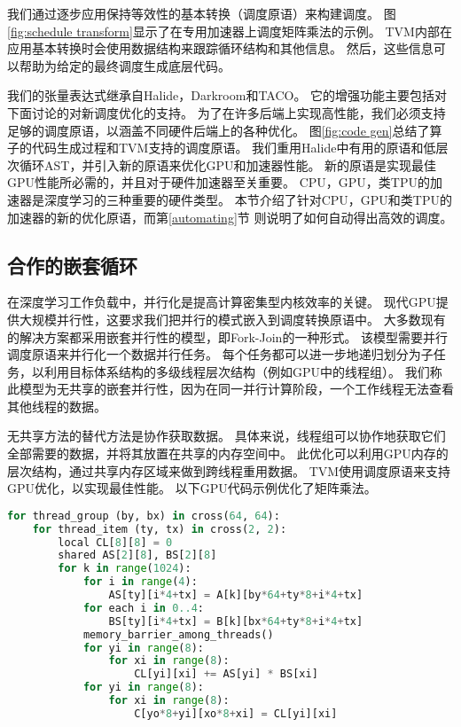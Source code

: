 我们通过逐步应用保持等效性的基本转换（调度原语）来构建调度。
图\ref{fig:schedule transform}显示了在专用加速器上调度矩阵乘法的示例。
TVM内部在应用基本转换时会使用数据结构来跟踪循环结构和其他信息。
然后，这些信息可以帮助为给定的最终调度生成底层代码。

我们的张量表达式继承自Halide，Darkroom和TACO。
它的增强功能主要包括对下面讨论的对新调度优化的支持。
为了在许多后端上实现高性能，我们必须支持足够的调度原语，以涵盖不同硬件后端上的各种优化。
图\ref{fig:code gen}总结了算子的代码生成过程和TVM支持的调度原语。
我们重用Halide中有用的原语和低层次循环AST，并引入新的原语来优化GPU和加速器性能。
新的原语是实现最佳GPU性能所必需的，并且对于硬件加速器至关重要。
CPU，GPU，类TPU的加速器是深度学习的三种重要的硬件类型。
本节介绍了针对CPU，GPU和类TPU的加速器的新的优化原语，而第\ref{automating}节
则说明了如何自动得出高效的调度。

\subsection{合作的嵌套循环}
在深度学习工作负载中，并行化是提高计算密集型内核效率的关键。
现代GPU提供大规模并行性，这要求我们把并行的模式嵌入到调度转换原语中。
大多数现有的解决方案都采用嵌套并行性的模型，即Fork-Join的一种形式。
该模型需要并行调度原语来并行化一个数据并行任务。
每个任务都可以进一步地递归划分为子任务，以利用目标体系结构的多级线程层次结构（例如GPU中的线程组）。
我们称此模型为无共享的嵌套并行性，因为在同一并行计算阶段，一个工作线程无法查看其他线程的数据。

无共享方法的替代方法是协作获取数据。
具体来说，线程组可以协作地获取它们全部需要的数据，并将其放置在共享的内存空间中。
此优化可以利用GPU内存的层次结构，通过共享内存区域来做到跨线程重用数据。
TVM使用调度原语来支持GPU优化，以实现最佳性能。
以下GPU代码示例优化了矩阵乘法。

\begin{lstlisting}[language={Python}]
for thread_group (by, bx) in cross(64, 64):
    for thread_item (ty, tx) in cross(2, 2):
        local CL[8][8] = 0
        shared AS[2][8], BS[2][8]
        for k in range(1024):
            for i in range(4):
                AS[ty][i*4+tx] = A[k][by*64+ty*8+i*4+tx]
            for each i in 0..4:
                BS[ty][i*4+tx] = B[k][bx*64+ty*8+i*4+tx]
            memory_barrier_among_threads()
            for yi in range(8):
                for xi in range(8):
                    CL[yi][xi] += AS[yi] * BS[xi]
            for yi in range(8):
                for xi in range(8):
                    C[yo*8+yi][xo*8+xi] = CL[yi][xi] 
\end{lstlisting}

